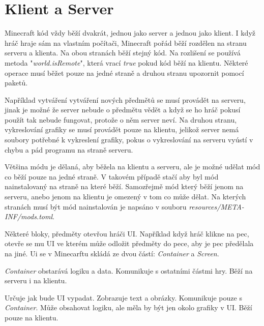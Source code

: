 \documentclass[FM,RP]{tulthesis}
\begin{document}
\section{Klient a Server}
Minecraft kód vždy běží dvakrát, jednou jako server a jednou jako klient. I když hráč hraje sám na vlastním počítači, Minecraft pořád běží rozdělen na stranu serveru a klienta. Na obou stranách běží stejný kód. Na rozlišení se používá metoda "\textit{world.isRemote}", která vrací \textit{true} pokud kód běží na klientu. Některé operace musí běžet pouze na jedné straně a druhou stranu upozornit pomocí paketů.
\par Například vytváření vytváření nových předmětů se musí provádět na serveru, jinak je možné že server nebude o předmětu vědět a když se ho hráč pokusí použít tak nebude fungovat, protože o něm server neví. Na druhou stranu, vykreslování grafiky se musí provádět pouze na klientu, jelikož server nemá soubory potřebné k vykreslení grafiky, pokus o vykreslování na serveru vyústí v chybu a pád programu na straně serveru. 
\par Většina módu je dělaná, aby běžela na klientu a serveru, ale je možné udělat mód co běží pouze na jedné straně. V takovém případě stačí aby byl mód nainstalovaný na straně na které běží. Samozřejmě mód který běží jenom na serveru, anebo jenom na klientu je omezený v tom co může dělat. Na kterých stranách musí být mód nainstalován je napsáno v souboru \textit{resources/META-INF/mods.toml}.
\par Některé bloky, předměty otevřou hráči UI. Například když hráč klikne na pec, otevře se mu UI ve kterém může odložit předměty do pece, aby je pec předělala na jiné. Ui se v Minecarftu skládá ze dvou částí: \textit{Container} a \textit{Screen}.
\par \textit{Container} obstarává logiku a data. Komunikuje s ostatními částmi hry. Běží na serveru i na  klientu.
\par Určuje jak bude UI vypadat. Zobrazuje text a obrázky. Komunikuje pouze s \textit{Container}. Může obsahovat logiku, ale měla by být jen okolo grafiky v UI. Běží pouze na klientu.
\end{document}
